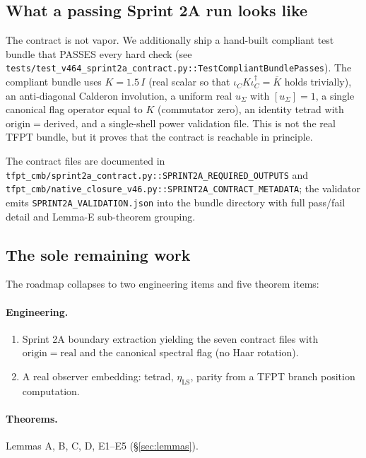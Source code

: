 \subsection{What a passing Sprint 2A run looks like}

The contract is not vapor.  We additionally ship a hand-built compliant
test bundle that PASSES every hard check (see
\texttt{tests/test\_v464\_sprint2a\_contract.py::TestCompliantBundlePasses}).
The compliant bundle uses
\(K=1.5\,I\) (real scalar so that
\(\iota_C K \iota_C^\dagger=\overline{K}\) holds trivially), an
anti-diagonal Calderon involution, a uniform real \(u_\Sigma\) with
\([u_\Sigma]=1\), a single canonical flag operator equal to
\(K\) (commutator zero), an identity tetrad with
\(\mathrm{origin}=\mathrm{derived}\), and a single-shell power
validation file.  This is not the real TFPT bundle, but it proves
that the contract is reachable in principle.

The contract files are documented in
\texttt{tfpt\_cmb/sprint2a\_contract.py::SPRINT2A\_REQUIRED\_OUTPUTS}
and
\texttt{tfpt\_cmb/native\_closure\_v46.py::SPRINT2A\_CONTRACT\_METADATA};
the validator emits \texttt{SPRINT2A\_VALIDATION.json} into the bundle
directory with full pass/fail detail and Lemma-E sub-theorem grouping.

\subsection{The sole remaining work}

The roadmap collapses to two engineering items and five theorem items:

\paragraph{Engineering.}
\begin{enumerate}[leftmargin=1.4em]
\item Sprint 2A boundary extraction yielding the seven contract
files with \(\mathrm{origin}=\mathrm{real}\) and the canonical
spectral flag (no Haar rotation).
\item A real observer embedding: tetrad, \(\eta_{\mathrm{LS}}\),
parity from a TFPT branch position computation.
\end{enumerate}

\paragraph{Theorems.}
Lemmas A, B, C, D, E1--E5 (\S\ref{sec:lemmas}).

